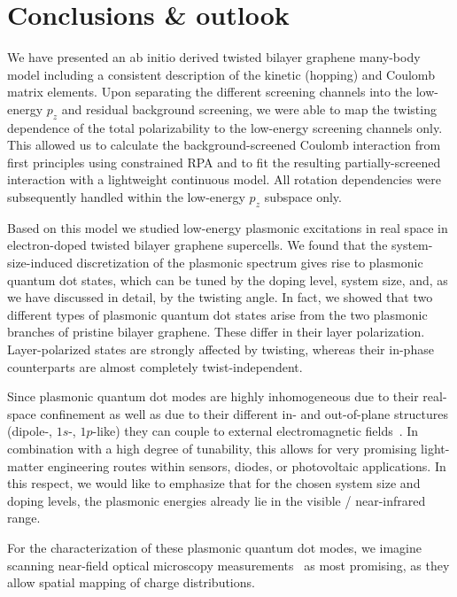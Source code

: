 \section{Conclusions \& outlook}
    
We have presented an ab initio derived twisted bilayer graphene many-body model including a consistent description of the kinetic (hopping) and Coulomb matrix elements. Upon separating the different screening channels into the low-energy $p_z$ and residual background screening, we were able to map the twisting dependence of the total polarizability to the low-energy screening channels only. This allowed us to calculate the background-screened Coulomb interaction from first principles using constrained RPA and to fit the resulting partially-screened interaction with a lightweight continuous model. All rotation dependencies were subsequently handled within the low-energy $p_z$ subspace only. 

Based on this model we studied low-energy plasmonic excitations in real space in electron-doped twisted bilayer graphene supercells. We found that the system-size-induced discretization of the plasmonic spectrum gives rise to plasmonic quantum dot states, which can be tuned by the doping level, system size, and, as we have discussed in detail, by the twisting angle. In fact, we showed that two different types of plasmonic quantum dot states arise from the two plasmonic branches of pristine bilayer graphene. These differ in their layer polarization. Layer-polarized states are strongly affected by twisting, whereas their in-phase counterparts are almost completely twist-independent.

Since plasmonic quantum dot modes are highly inhomogeneous due to their real-space confinement as well as due to their different in- and out-of-plane structures (dipole-, $1s$-, $1p$-like) they can couple to external electromagnetic fields~\cite{crowell_surface-plasmon_1970,maradudin_scattering_1975}. In combination with a high degree of tunability, this allows for very promising light-matter engineering routes within sensors, diodes, or photovoltaic applications. In this respect, we would like to emphasize that for the chosen system size and doping levels, the plasmonic energies already lie in the visible / near-infrared range. 

For the characterization of these plasmonic quantum dot modes, we imagine scanning near-field optical microscopy measurements~\cite{fei_gate-tuning_2012,chen_optical_2012} as most promising, as they allow spatial mapping of charge distributions.

